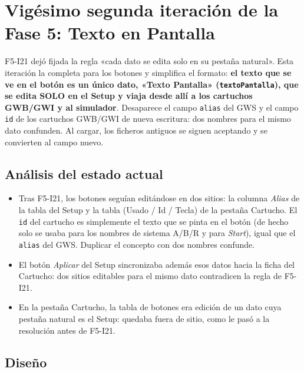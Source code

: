 \section{Vigésimo segunda iteración de la Fase 5: Texto en Pantalla}
\label{sec:F5I22}

F5-I21 dejó fijada la regla «cada dato se edita solo en su pestaña natural». Esta iteración la completa para los botones y simplifica el formato: \textbf{el texto que se ve en el botón es un único dato, «Texto Pantalla» (\texttt{textoPantalla}), que se edita SOLO en el Setup y viaja desde allí a los cartuchos GWB/GWI y al simulador}. Desaparece el campo \texttt{alias} del GWS y el campo \texttt{id} de los cartuchos GWB/GWI de nueva escritura: dos nombres para el mismo dato confunden. Al cargar, los ficheros antiguos se siguen aceptando y se convierten al campo nuevo.

\subsection{Análisis del estado actual}
\label{sec:F5I22Analisis}

\begin{itemize}
	\item Tras F5-I21, los botones seguían editándose en dos sitios: la columna \emph{Alias} de la tabla del Setup y la tabla (Usado / Id / Tecla) de la pestaña Cartucho. El \texttt{id} del cartucho es simplemente el texto que se pinta en el botón (de hecho solo se usaba para los nombres de sistema A/B/R y para \emph{Start}), igual que el \texttt{alias} del GWS. Duplicar el concepto con dos nombres confunde.
	\item El botón \emph{Aplicar} del Setup sincronizaba además esos datos hacia la ficha del Cartucho: dos sitios editables para el mismo dato contradicen la regla de F5-I21.
	\item En la pestaña Cartucho, la tabla de botones era edición de un dato cuya pestaña natural es el Setup: quedaba fuera de sitio, como le pasó a la resolución antes de F5-I21.
\end{itemize}

\subsection{Diseño}
\label{sec:F5I22Diseno}

